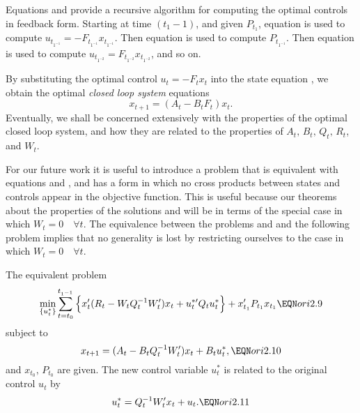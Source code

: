 Equations  and  provide a recursive algorithm
for computing the optimal controls in feedback form.  Starting at time
$(t_1 -1)$, and given
$P_{t_1}$, equation  is used to compute $u_{t_{1^{-1}}} =
- F_{t_{1^{-1}}} x_{t_{1^{-1}}}$.  Then equation  is used to
compute $P_{t_{1^{-1}}}$.  Then equation  is used to compute
$u_{t_{1^{-2}}} = F_{t_{1^{-2}}} x_{t_{1^{-2}}}$, and so on.

By substituting the optimal control $u_t = - F_t x_t$ into the state equation
, we obtain the optimal {\it closed loop system\/} equations
$$x_{t+1} = (A_t - B_t F_t) x_t.$$
Eventually, we shall be concerned extensively with the properties of the
optimal closed loop system, and how they are related to the properties of $A_t,
\, B_t,\, Q_t,\, R_t$, and $W_t$.

\noindent For our future work it is useful to introduce a problem that is equivalent
with equations  and , and has a form in which no
cross products between states and controls appear in the objective
function.  This is useful because our theorems about the properties
of the solutions  and 
will be in terms of the special case in which $W_t = 0\quad \forall t$.  The
equivalence between the problems  and  and the
following problem
implies that no generality is lost by restricting ourselves to the case in
which $W_t = 0\quad \forall t$.
\par
The equivalent problem
$$\min_{\{u^\ast_t\}} \sum^{t_{1^{-1}}}_{t=t_0}\, \Bigl\{x^\prime_t (R_t - W_t
Q_t^{-1} W^\prime_t) x_t + u_t^{\ast\prime} Q_t u^\ast_t \Bigr\} +
x^\prime_{t_1} P_{t_1} x_{t_1} \EQN ori2.9$$
subject to
$$x_{t+1} = (A_t - B_t Q_t^{-1} W^\prime_t) x_t + B_t u^\ast_t,\EQN ori2.10$$
and $x_{t_0}, \, P_{t_0}$ are given.  The new control variable $u^\ast_t$ is
related to the original control $u_t$ by
$$u^\ast_t = Q^{-1}_t W^\prime_t x_t + u_t .\EQN ori2.11$$

